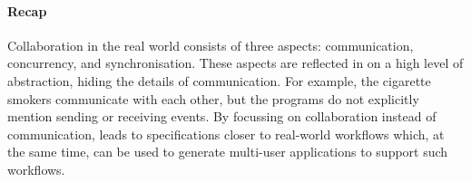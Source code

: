 \paragraph{Recap}

Collaboration in the real world consists of three aspects: communication, concurrency, and synchronisation.
These aspects are reflected in \TOP on a high level of abstraction, hiding the details of communication.
For example, the cigarette smokers communicate with each other, but the programs do not explicitly mention sending or receiving events.
By focussing on collaboration instead of communication, \TOP leads to specifications closer to real-world workflows which, at the same time, can be used to generate multi-user applications to support such workflows.
